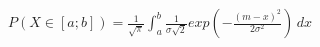 \documentclass[preview]{standalone}
\begin{document}
\begin{align*}
P( X \in [a;b] ) = { \frac{1}{\sqrt{\pi}} } \int_a^b { { \frac{1}{\sigma \sqrt{2}} } exp(-{ \frac{(m - x)^2}{2 \sigma^2} }) } \, dx
\end{align*}
\end{document}
